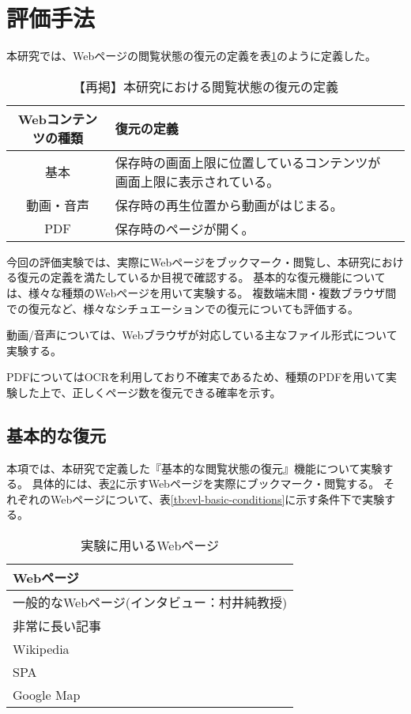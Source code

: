 \section{評価手法}
本研究では、Webページの閲覧状態の復元の定義を表\ref{tb:restore-definition}のように定義した。

\begin{table}[htbp]
  \begin{center}
    \caption{【再掲】本研究における閲覧状態の復元の定義}
    \label{tb:restore-definition}
    \begin{tabular}{|c|l|l|}
      \hline
      Webコンテンツの種類 & 復元の定義 \\\hline\hline
      基本 & 保存時の画面上限に位置しているコンテンツが画面上限に表示されている。 \\\hline
      動画・音声 & 保存時の再生位置から動画がはじまる。 \\\hline
      PDF & 保存時のページが開く。 \\\hline
    \end{tabular}
  \end{center}
\end{table}

今回の評価実験では、実際にWebページをブックマーク・閲覧し、本研究における復元の定義を満たしているか目視で確認する。
基本的な復元機能については、様々な種類のWebページを用いて実験する。
複数端末間・複数ブラウザ間での復元など、様々なシチュエーションでの復元についても評価する。

動画/音声については、Webブラウザが対応している主なファイル形式について実験する。

PDFについてはOCRを利用しており不確実であるため、種類のPDFを用いて実験した上で、正しくページ数を復元できる確率を示す。

\subsection{基本的な復元}
本項では、本研究で定義した『基本的な閲覧状態の復元』機能について実験する。
具体的には、表\ref{tb:evl-basic-web-contents}に示すWebページを実際にブックマーク・閲覧する。
それぞれのWebページについて、表\ref{tb:evl-basic-conditions}に示す条件下で実験する。

\begin{table}[htbp]
  \label{tb:evl-basic-web-contents}
  \caption{実験に用いるWebページ}
  \begin{center}
    \begin{tabular}{|l|}
    \hline
    Webページ  \\ \hline
    一般的なWebページ(インタビュー：村井純教授) \\ \hline
    非常に長い記事 \\ \hline
    Wikipedia \\ \hline
    SPA \\ \hline
    Google Map \\ \hline
    \end{tabular}
  \end{center}
\end{table}

